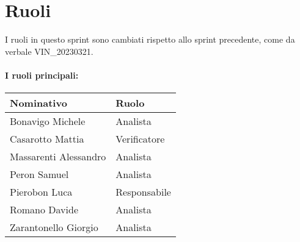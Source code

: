 \section{Ruoli}

I ruoli in questo sprint sono cambiati rispetto allo sprint precedente, come da verbale VIN\_20230321.

\paragraph{I ruoli principali:}

\begin{center}
    \begin{tabularx}{\textwidth}{X l}
        
        \rowcolor{gray!30} \textbf{Nominativo} & \textbf{Ruolo}\\
        
        \hline

        Bonavigo Michele & Analista \\
        \rowcolor{gray!10}Casarotto Mattia & Verificatore \\
        Massarenti Alessandro & Analista \\
        \rowcolor{gray!10}Peron Samuel & Analista \\
        Pierobon Luca & Responsabile \\
        \rowcolor{gray!10}Romano Davide & Analista \\
        Zarantonello Giorgio & Analista \\

    \end{tabularx}
\end{center}
